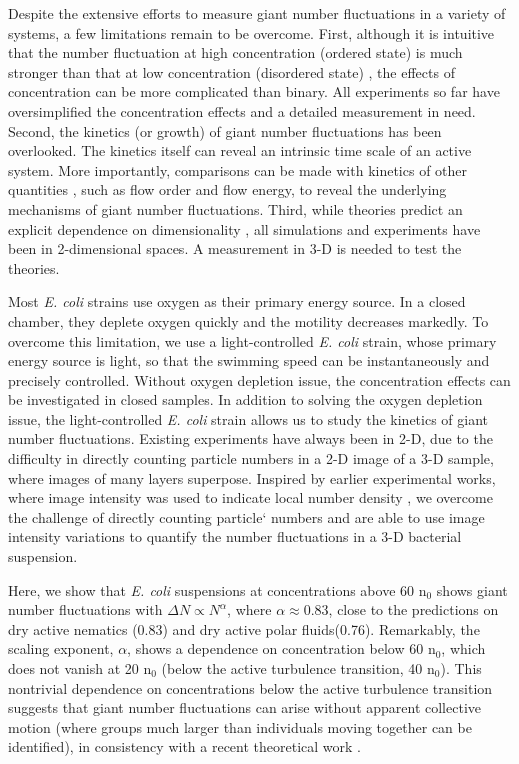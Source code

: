 \documentclass[twocolumn,aps,pre,amsmath,amssymb,floatfix,longbibliography]{revtex4-1}
\begin{document}
Despite the extensive efforts to measure giant number fluctuations in a variety of systems, a few limitations remain to be overcome. First, although it is intuitive that the number fluctuation at high concentration (ordered state) is much stronger than that at low concentration (disordered state) \cite{PhysRevE.95.020601, Zhang13626}, the effects of concentration can be more complicated than binary. All experiments so far have oversimplified the concentration effects and a detailed measurement in need. Second, the kinetics (or growth) of giant number fluctuations has been overlooked. The kinetics itself can reveal an intrinsic time scale of an active system. More importantly, comparisons can be made with kinetics of other quantities \cite{Peng2020}, such as flow order and flow energy, to reveal the underlying mechanisms of giant number fluctuations. Third, while theories predict an explicit dependence on dimensionality \cite{doi:10.1146/annurev-conmatphys-031119-050752}, all simulations and experiments have been in 2-dimensional spaces. A measurement in 3-D is needed to test the theories.

Most \textit{E. coli} strains use oxygen as their primary energy source. In a closed chamber, they deplete oxygen quickly and the motility decreases markedly. To overcome this limitation, we use a light-controlled \textit{E. coli} strain, whose primary energy source is light, so that the swimming speed can be instantaneously and precisely controlled. Without oxygen depletion issue, the concentration effects can be investigated in closed samples. In addition to solving the oxygen depletion issue, the light-controlled \textit{E. coli} strain allows us to study the kinetics of giant number fluctuations. Existing experiments have always been in 2-D, due to the difficulty in directly counting particle numbers in a 2-D image of a 3-D sample, where images of many layers superpose. Inspired by earlier experimental works, where image intensity was used to indicate local number density \cite{PhysRevLett.106.018101, Schaller4488}, we overcome the challenge of directly counting particle` numbers and are able to use image intensity variations to quantify the number fluctuations in a 3-D bacterial suspension.


Here, we show that \textit{E. coli} suspensions at concentrations above 60 n$_0$ shows giant number fluctuations with $\Delta N \varpropto N^\alpha$, where $\alpha\approx0.83$, close to the predictions on dry active nematics (0.83) and dry active polar fluids(0.76). Remarkably, the scaling exponent, $\alpha$, shows a dependence on concentration below 60 n$_0$, which does not vanish at 20 n$_0$ (below the active turbulence transition, 40 n$_0$). This nontrivial dependence on concentrations below the active turbulence transition suggests that giant number fluctuations can arise without apparent collective motion (where groups much larger than individuals moving together can be identified), in consistency with a recent theoretical work \cite{PhysRevLett.119.028005}.
\end{document}
